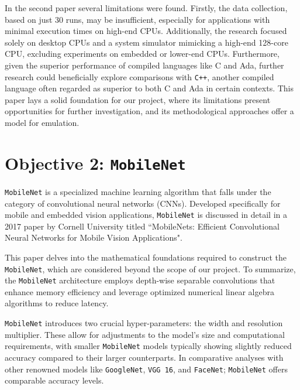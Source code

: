 In the second paper\cite{mpbenchmark_paper} several limitations were found. Firstly, the data collection, based on just 30 runs, may be insufficient, especially for applications with minimal execution times on high-end CPUs. Additionally, the research focused solely on desktop CPUs and a system simulator mimicking a high-end 128-core CPU, excluding experiments on embedded or lower-end CPUs. Furthermore, given the superior performance of compiled languages like C and Ada, further research could beneficially explore comparisons with \texttt{C++}, another compiled language often regarded as superior to both C and Ada in certain contexts. This paper lays a solid foundation for our project, where its limitations present opportunities for further investigation, and its methodological approaches offer a model for emulation.

\section{Objective 2: \texttt{MobileNet}}

\texttt{MobileNet} is a specialized machine learning algorithm that falls under the category of convolutional neural networks (CNNs). Developed specifically for mobile and embedded vision applications, \texttt{MobileNet} is discussed in detail in a 2017 paper by Cornell University titled ``MobileNets: Efficient Convolutional Neural Networks for Mobile Vision Applications"\cite{mobilenet_paper}. 

This paper\cite{mobilenet_paper} delves into the mathematical foundations required to construct the \texttt{MobileNet}, which are considered beyond the scope of our project. To summarize, the \texttt{MobileNet} architecture employs depth-wise separable convolutions that enhance memory efficiency and leverage optimized numerical linear algebra algorithms to reduce latency.

\texttt{MobileNet} introduces two crucial hyper-parameters: the width and resolution multiplier. These allow for adjustments to the model's size and computational requirements, with smaller \texttt{MobileNet} models typically showing slightly reduced accuracy compared to their larger counterparts. In comparative analyses with other renowned models like \texttt{GoogleNet}, \texttt{VGG 16}, and \texttt{FaceNet}; \texttt{MobileNet} offers comparable accuracy levels.

